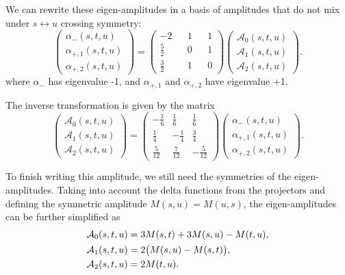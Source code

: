 We can rewrite these eigen-amplitudes in a basis of amplitudes that do not mix under $s\leftrightarrow u$ crossing symmetry:
$$
\begin{pmatrix}
    \alpha_{-}(s,t,u) \\ \alpha_{+,1}(s,t,u) \\ \alpha_{+,2}(s,t,u)
\end{pmatrix} = 
\begin{pmatrix}
    -2 && 1 && 1 \\ \frac{5}{2} && 0 && 1 \\ \frac{3}{2} && 1 &&0
\end{pmatrix}
\begin{pmatrix}
    \mathcal{A}_0(s,t,u) \\ \mathcal{A}_1(s, t, u) \\ \mathcal{A}_2(s,t,u)
\end{pmatrix}.
$$
where $\alpha_{-}$ has eigenvalue -1, and $\alpha_{+, 1}$ and $\alpha_{+, 2}$ have eigenvalue +1. 

The inverse transformation is given by the matrix 
$$
\begin{pmatrix}
    \mathcal{A}_0(s,t,u) \\ \mathcal{A}_1(s, t, u) \\ \mathcal{A}_2(s,t,u)
\end{pmatrix} = 
\begin{pmatrix}
-\frac{1}{6} & \frac{1}{6} & \frac{1}{6} \\
\frac{1}{4} & -\frac{1}{4} & \frac{3}{4} \\
\frac{5}{12} & \frac{7}{12} & -\frac{5}{12}
\end{pmatrix}
\begin{pmatrix}
    \alpha_{-}(s,t,u) \\ \alpha_{+,1}(s,t,u) \\ \alpha_{+,2}(s,t,u)
\end{pmatrix}.
$$

To finish writing this amplitude, we still need the symmetries of the eigen-amplitudes. Taking into account the delta functions from the projectors and defining the symmetric amplitude $M(s, u) = M(u, s)$, the eigen-amplitudes can be further simplified as 
\begin{align}
    \mathcal{A}_0(s,t,u) &= 3M(s,t) + 3M(s,u) - M(t,u), \notag\\
    \mathcal{A}_1(s,t,u) &= 2\bigl(M(s,u) - M(s,t)\bigr), \notag\\
    \mathcal{A}_2(s,t,u) &= 2M(t,u). \notag
\end{align}

